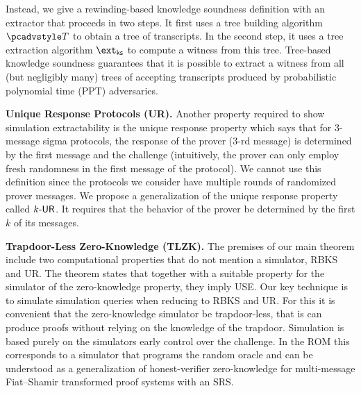 \documentclass[11pt]{llncs}
\newcommand{\oursubsub}[1] {\smallskip\noindent\textbf{#1}}
\begin{document}
Instead, we give a rewinding-based knowledge soundness definition with an extractor that proceeds in two steps. It first uses a tree building algorithm $\tdv$ to obtain a tree of transcripts. In the second step, it uses a tree extraction algorithm $\extcss$ to compute a witness from this tree. Tree-based knowledge soundness guarantees that it is possible to extract a witness from all
(but negligibly many) trees of accepting transcripts produced by probabilistic
polynomial time (PPT) adversaries.

\oursubsub{Unique Response Protocols (UR).}  Another property
required to show simulation extractability is the unique response property which says
that for $3$-message sigma protocols, the response of the prover ($3$-rd message) is determined by the first message and the challenge (intuitively, the prover can only employ fresh randomness in the first
message of the protocol). We cannot use this definition since the protocols
we consider have multiple rounds of randomized prover messages. We propose a generalization of the unique response property called ${k\text{-}\mathsf{UR}}$. It requires that the behavior of the prover be determined by the first
$k$ of its messages. 

\oursubsub{Trapdoor-Less Zero-Knowledge (TLZK).} 
The premises of our main theorem include two computational properties that do not mention a simulator, RBKS and UR. The theorem states that together with a suitable property for the simulator of the zero-knowledge property, they imply USE.
%
Our key technique is to simulate simulation queries when reducing to RBKS and UR. For this it is convenient that the zero-knowledge simulator be trapdoor-less, that is can produce proofs without relying on the
knowledge of the trapdoor. Simulation is based purely on the simulators early control over the challenge. 
%
In the ROM this corresponds to a simulator that programs the random oracle and can be understood as a generalization of
honest-verifier zero-knowledge for multi-message Fiat--Shamir transformed proof systems with an
SRS. 
\end{document}
